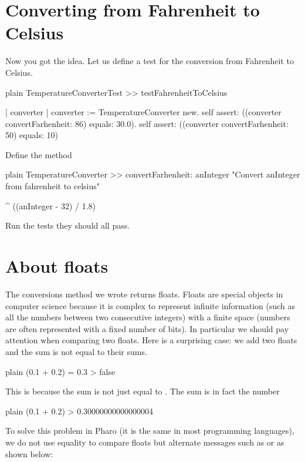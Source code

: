 \documentclass[10pt,twoside,english]{_support/latex/sbabook/sbabook}
\begin{document}
\section{Converting from Fahrenheit to Celsius}
Now you got the idea. Let us define a test for the conversion from Fahrenheit to Celsius.

\begin{displaycode}{plain}
TemperatureConverterTest >> testFahrenheitToCelsius

    | converter |
    converter := TemperatureConverter new.
    self assert: ((converter convertFarhenheit: 86) equals: 30.0).
    self assert: ((converter convertFarhenheit: 50) equals: 10)
\end{displaycode}

Define the method 

\begin{displaycode}{plain}
TemperatureConverter >> convertFarhenheit: anInteger
    "Convert anInteger from fahrenheit to celsius"

    ^ ((anInteger - 32) / 1.8)
\end{displaycode}

Run the tests they should all pass.
\section{About floats}
The conversions method we wrote returns floats. Floats are special objects in computer science because it is complex to represent infinite information (such as all the numbers between two consecutive integers) with a finite space (numbers are often represented with a fixed number of bits). In particular we should pay attention when comparing
two floats. Here is a surprising case: we add two floats and the sum is not equal to their sums.

\begin{displaycode}{plain}
(0.1 + 0.2) = 0.3
> false
\end{displaycode}

This is because the sum is not just equal to . The sum is in fact the number  

\begin{displaycode}{plain}
(0.1 + 0.2)
> 0.30000000000000004
\end{displaycode}

To solve this problem in Pharo (it is the same in most programming languages), we do not use equality to compare
floats but alternate messages such as  or  as shown below:
\end{document}
